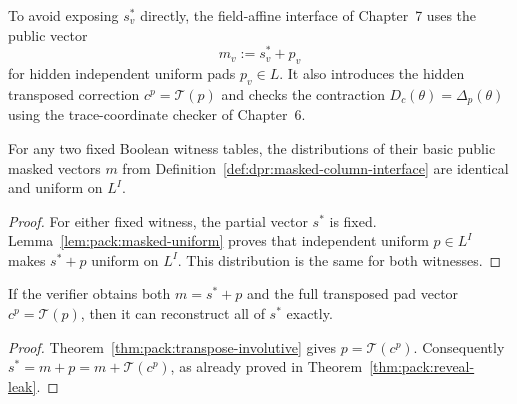 \begin{definition}\label{def:dpr:masked-column-interface}
To avoid exposing $s_v^*$ directly,
the field-affine interface of
Chapter~7 uses the public vector
\[
 m_v:=s_v^*+p_v
\]
for hidden independent uniform
pads $p_v\in L$. It also introduces
the hidden transposed correction
$c^p=\mathcal T(p)$
and checks the contraction
$D_c(\theta)=\Delta_p(\theta)$
using the trace-coordinate
checker of Chapter~6.
\end{definition}

\begin{lemma}\label{lem:dpr:masked-column-uniform}
For any two fixed Boolean witness
tables, the distributions of their
basic public masked vectors $m$
from Definition~\ref{def:dpr:masked-column-interface}
are identical and uniform on $L^I$.
\end{lemma}
\begin{proof}
For either fixed witness,
the partial vector $s^*$
is fixed. Lemma~\ref{lem:pack:masked-uniform}
proves that independent uniform
$p\in L^I$ makes $s^*+p$
uniform on $L^I$.
This distribution is the same
for both witnesses.
\end{proof}

\begin{lemma}\label{lem:dpr:masked-correction-reveal}
If the verifier obtains both
$m=s^*+p$ and the full
transposed pad vector
$c^p=\mathcal T(p)$,
then it can reconstruct
all of $s^*$ exactly.
\end{lemma}
\begin{proof}
Theorem~\ref{thm:pack:transpose-involutive}
gives $p=\mathcal T(c^p)$.
Consequently
$s^*=m+p=m+\mathcal T(c^p)$,
as already proved in
Theorem~\ref{thm:pack:reveal-leak}.
\end{proof}

